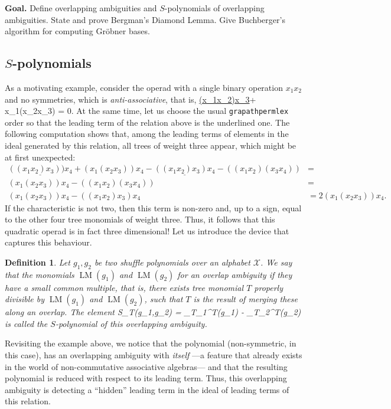 \documentclass[fleqn, a4paper, twoside]{article}
\makeatletter
\newcommand{\leadm}[1]{\operatorname{LM}(#1)}
\newcommand{\repl}[3]{\square_{#1}^{#2}(#3)}
\newcommand{\0}{\langle 0\rangle}
\newcommand{\XX}{\mathcal{X}}
\let\[\@undefined
\DeclareRobustCommand{\[}{\begin{equation}}%
\let\]\@undefined
\DeclareRobustCommand{\]}{\end{equation}}%
\theoremstyle{mytheorem}
\theoremstyle{introthm}
\theoremstyle{mydefinition}
\newtheorem{definition}[theorem]{Definition}
\theoremstyle{mydefinition2}
\theoremstyle{plain} %
\newcommand{\?}{\,?\,}
\theoremstyle{mytheorem}
\theoremstyle{plain} %
\makeatother
\begin{document}
\textbf{Goal.} 
Define overlapping ambiguities and $S$-polynomials of overlapping
ambiguities. State and prove Bergman's Diamond Lemma. 
Give Buchberger's algorithm for computing Gr\"obner bases.

\subsection{$S$-polynomials}

As a motivating example, consider the operad
with a single binary operation $x_1x_2$ and no
symmetries, which is \emph{anti-associative}, that is,
\[
\underline{(x_1x_2)x_3}+ x_1(x_2x_3)  = 0.
\] 
At the same time, let us choose the usual \texttt{grapathpermlex}
order so that the leading term of the relation above
is the underlined one. The following computation shows that,
among the leading terms of elements in the ideal
generated by this relation, all trees of weight three appear,
which might be at first unexpected:
\begin{align*}
\underline{((x_1x_2)x_3))x_4} + (x_1(x_2x_3))x_4 -
\underline{((x_1x_2)x_3)x_4}- ((x_1 x_2)(x_3x_4)) &=  \\
 (x_1(x_2x_3))x_4 - ((x_1 x_2)(x_3x_4)) &= \\
 (x_1(x_2x_3))x_4 - ((x_1 x_2)x_3)x_4 &=  2(x_1(x_2x_3))x_4.
\end{align*}
If the characteristic is not two, then this term is non-zero
and, up to a sign, equal to the other four tree monomials
of weight three. Thus, it follows that this quadratic operad
is in fact three dimensional! Let us introduce the device 
that captures this behaviour.

\begin{definition}
Let $g_1,g_2$ be two shuffle polynomials over an alphabet $\XX$.
We say that the monomials $\leadm{g_1}$ and $\leadm{g_2}$ for
an overlap ambiguity if they have a \emph{small common multiple},
that is, there exists tree monomial $T$ properly divisible by  
$\leadm{g_1}$ and $\leadm{g_2}$, such that $T$ is the result
of merging these along an overlap. The element
\[
S_T(g_1,g_2) = 
\repl{T_1}{T}{g_1} - \repl{T_2}{T}{g_2}	
\]
is called the $S$-polynomial of this overlapping ambiguity.
\end{definition}

Revisiting the example above, we notice that the
polynomial (non-symmetric, in this case), has an overlapping
ambiguity with \emph{itself} ---a feature that already exists
in the world of non-commutative associative algebras--- and
that the resulting polynomial is reduced with respect to
its leading term. Thus, this overlapping ambiguity is
detecting a ``hidden'' leading term in the ideal of
leading terms of this relation. 
\end{document}

